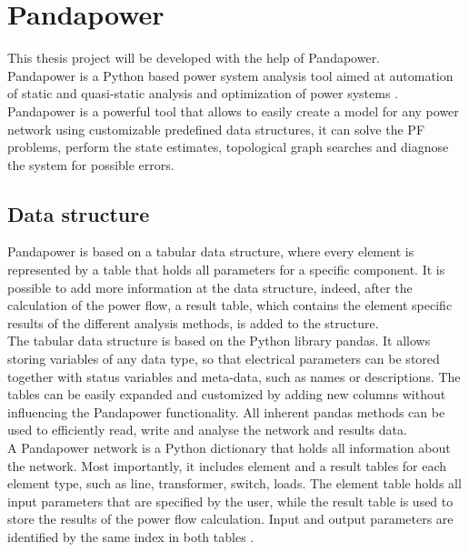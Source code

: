 
\section{Pandapower}
\label{ch:pandapower}
This thesis project will be developed with the help of Pandapower. \\
Pandapower is a Python based power system analysis tool aimed at automation of static and quasi-static analysis and optimization of power systems \cite{pandapower}. \\
Pandapower is a powerful tool that allows to easily create a model for any power network using customizable predefined data structures, it can solve the \gls{PF} problems, perform the state estimates, topological graph searches and diagnose the system for possible errors.

\subsection{Data structure}
Pandapower is based on a tabular data structure, where every element is represented by a table that holds all parameters for a specific component. It is possible to add more information at the data structure, indeed, after the calculation of the power flow, a result table, which contains the element specific results of the different analysis methods, is added to the structure. \\
The tabular data structure is based on the Python library pandas. It allows storing variables of any data type, so that electrical parameters can be stored together with status variables and meta-data, such as names or descriptions. The tables can be easily expanded and customized by adding new columns without influencing the Pandapower functionality. All inherent pandas methods can be used to efficiently read, write and analyse the network and results data. \\

A Pandapower network is a Python dictionary that holds all information about the network. Most importantly, it includes element and a result tables for each element type, such as line, transformer, switch, loads. The element table holds all input parameters that are specified by the user, while the result table is used to store the results of the power flow calculation. Input and output parameters are identified by the same index in both tables \cite{pandapower}.

